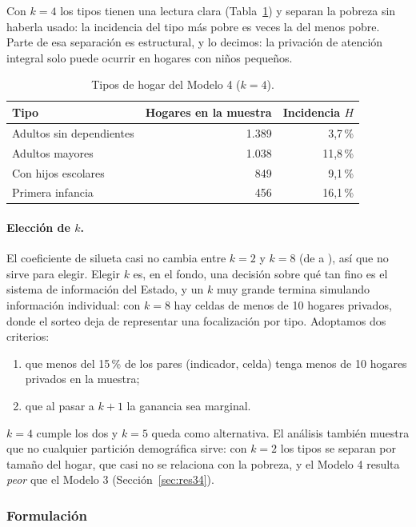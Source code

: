 Con $k=4$ los tipos tienen una lectura clara (Tabla~\ref{tab:clusters}) y
separan la pobreza sin haberla usado: la incidencia del tipo más pobre es
\cSeparaPobreza{} veces la del menos pobre. Parte de esa separación es
estructural, y lo decimos: la privación de atención integral solo puede ocurrir en
hogares con niños pequeños.

\begin{table}[ht]
\centering\small
\caption{Tipos de hogar del Modelo 4 ($k=4$).}\label{tab:clusters}
\begin{tabular}{@{}lrr@{}}
\toprule
Tipo & Hogares en la muestra & Incidencia $H$ \\
\midrule
Adultos sin dependientes & 1.389 & 3,7\,\% \\
Adultos mayores          & 1.038 & 11,8\,\% \\
Con hijos escolares      &   849 & 9,1\,\% \\
Primera infancia         &   456 & 16,1\,\% \\
\bottomrule
\end{tabular}
\end{table}

\paragraph{Elección de $k$.}
El coeficiente de silueta casi no cambia entre $k=2$ y $k=8$ (de \cSiluetaMin{}
a \cSiluetaMax{}), así que no sirve para elegir. Elegir $k$ es, en el fondo, una
decisión sobre qué tan fino es el sistema de información del Estado, y un $k$
muy grande termina simulando información individual: con $k=8$ hay celdas de
menos de 10 hogares privados, donde el sorteo deja de representar una
focalización por tipo. Adoptamos dos criterios:
\begin{enumerate}
\item que menos del 15\,\% de los pares (indicador, celda) tenga menos de 10
  hogares privados en la muestra;
\item que al pasar a $k+1$ la ganancia sea marginal.
\end{enumerate}
$k=4$ cumple los dos y $k=5$ queda como alternativa. El análisis también muestra
que no cualquier partición demográfica sirve: con $k=2$ los tipos se separan por
tamaño del hogar, que casi no se relaciona con la pobreza, y el Modelo 4 resulta
\emph{peor} que el Modelo 3 (Sección~\ref{sec:res34}).

\subsubsection{Formulación}


